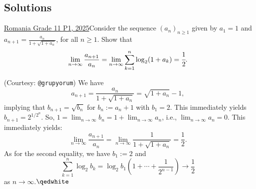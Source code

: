 \subsection{Solutions}
\begin{problem}{1}{\href{https://artofproblemsolving.com/community/c7h3523176p34221514}{Romania Grade 11 P1, 2025}}Consider the sequence $(a_n)_{n\geq 1}$ given by $a_1=1$ and $a_{n+1}=\frac{a_n}{1+\sqrt{1+a_n}}$, for all $n\geq 1$. Show that$$\lim_{n\rightarrow\infty}\frac{a_{n+1}}{a_n} = \lim_{n\rightarrow\infty}\sum_{k=1}^n \log_2(1+a_k)=\cfrac{1}{2}.$$
	\begin{solution} (Courtesy: \texttt{@grupyorum}) We have
\[
a_{n+1} = \frac{a_n}{1+\sqrt{1+a_n}} = \sqrt{1+a_n}-1,
\]implying that $b_{n+1} = \sqrt{b_n}$ for $b_n:=a_n+1$ with $b_1=2$. This immediately yields $b_{n+1} = 2^{1/2^n}$. So, $1 = \textstyle \lim_{n\to\infty}b_n = 1+\lim_{n\to\infty}a_n$, i.e., $\textstyle \lim_{n\to\infty}a_n =0$. This immediately yields:
\[
\lim_{n\to\infty}\frac{a_{n+1}}{a_n} = \lim_{n\to\infty} \frac{1}{1+\sqrt{1+a_n}} = \frac{1}{2}.
\]As for the second equality, we have $b_1:=2$ and
\[
\sum_{k=1}^n \log_2 b_k = \log_2 b_1 \left(1+\cdots+\frac{1}{2^{n-1}}\right) \to \frac{1}{2}
\]as $n\to\infty$.$\qedwhite$
	\end{solution}
\end{problem}
	
